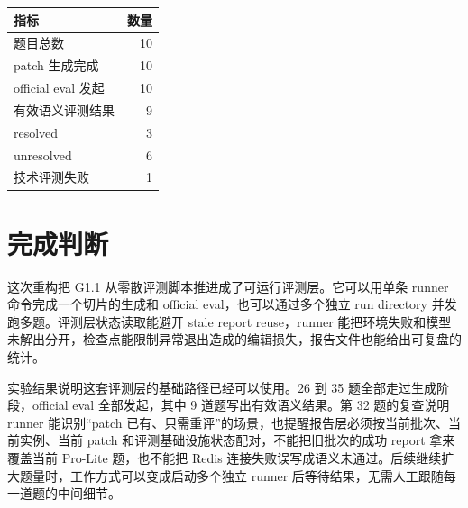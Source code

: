 \documentclass[UTF8,a4paper,11pt]{ctexart}
\begin{document}
\begin{center}
\begin{tabular}{lr}
\toprule
指标 & 数量\\
\midrule
题目总数 & 10\\
patch 生成完成 & 10\\
official eval 发起 & 10\\
有效语义评测结果 & 9\\
resolved & 3\\
unresolved & 6\\
技术评测失败 & 1\\
\bottomrule
\end{tabular}
\end{center}

\section{完成判断}

这次重构把 G1.1 从零散评测脚本推进成了可运行评测层。它可以用单条 runner 命令完成一个切片的生成和 official eval，也可以通过多个独立 run directory 并发跑多题。评测层状态读取能避开 stale report reuse，runner 能把环境失败和模型未解出分开，检查点能限制异常退出造成的编辑损失，报告文件也能给出可复盘的统计。

实验结果说明这套评测层的基础路径已经可以使用。26 到 35 题全部走过生成阶段，official eval 全部发起，其中 9 道题写出有效语义结果。第 32 题的复查说明 runner 能识别“patch 已有、只需重评”的场景，也提醒报告层必须按当前批次、当前实例、当前 patch 和评测基础设施状态配对，不能把旧批次的成功 report 拿来覆盖当前 Pro-Lite 题，也不能把 Redis 连接失败误写成语义未通过。后续继续扩大题量时，工作方式可以变成启动多个独立 runner 后等待结果，无需人工跟随每一道题的中间细节。
\end{document}
